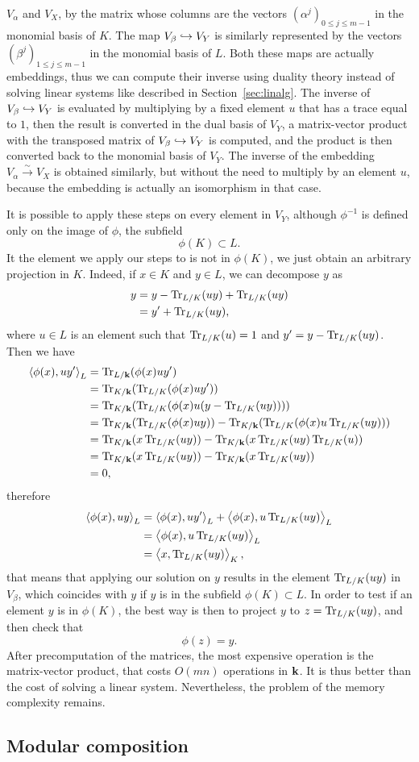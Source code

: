 $V_\alpha$ and $V_X$, by the matrix whose columns are the vectors
$(\alpha^j)_{0\leq j \leq m-1}$ in the monomial basis of $K$. The map
$V_\beta\hookrightarrow V_Y$ is similarly represented by the vectors
$(\beta^{j})_{1\leq j\leq m-1}$ in the monomial basis of $L$. Both these
maps are actually embeddings, thus we can compute their inverse using duality
theory instead of solving linear systems like described in
Section~\ref{sec:linalg}. The inverse of $V_\beta\hookrightarrow V_Y$ is evaluated by
multiplying by a fixed element $u$ that has a trace equal to $1$, then the
result is converted in the dual basis of $V_Y$, a matrix-vector product with the
transposed matrix of $V_\beta\hookrightarrow V_Y$ is computed, and the product is then
converted back to the monomial basis of $V_Y$. The inverse of the embedding
$V_\alpha\overset{\sim}{\to}V_X$ is obtained similarly, but without the need to
multiply by an element $u$, because the embedding is actually an isomorphism in
that case.

It is possible to apply these steps on every element in $V_Y$, although
$\phi^{-1}$ is defined only on the image of $\phi$, \ie the subfield
\[
  \phi(K)\subset L.
\]
It the element we apply our steps to is not in $\phi(K)$, we just obtain an
arbitrary projection in $K$. Indeed, if $x\in K$ and $y\in L$, we can decompose
$y$ as
\begin{align*}
  y &= y - \operatorname{Tr}_{L/K}(uy) + \operatorname{Tr}_{L/K}(uy)\\
  &= y' + \operatorname{Tr}_{L/K}(uy),
\end{align*}
where $u\in L$ is an element such that $\operatorname{Tr}_{L/K}(u)=1$ and
$y'=y-\operatorname{Tr}_{L/K}(uy)$. Then we have
\begin{align*}
  \left\langle\phi(x),uy'\right\rangle_L &= \operatorname{Tr}_{L/\mathbf{k}}(\phi(x)uy')\\
  &= \operatorname{Tr}_{K/\mathbf{k}}(\operatorname{Tr}_{L/K}(\phi(x)uy'))\\
  &= \operatorname{Tr}_{K/\mathbf{k}}(\operatorname{Tr}_{L/K}(\phi(x)u(y-\operatorname{Tr}_{L/K}(uy))))\\
  &=
  \operatorname{Tr}_{K/\mathbf{k}}(\operatorname{Tr}_{L/K}(\phi(x)uy))-\operatorname{Tr}_{K/\mathbf{k}}(\operatorname{Tr}_{L/K}(\phi(x)u\operatorname{Tr}_{L/K}(uy)))\\
  &= \operatorname{Tr}_{K/\mathbf{k}}(x\operatorname{Tr}_{L/K}(uy))-\operatorname{Tr}_{K/\mathbf{k}}(x\operatorname{Tr}_{L/K}(uy)\operatorname{Tr}_{L/K}(u))\\
  &= \operatorname{Tr}_{K/\mathbf{k}}(x\operatorname{Tr}_{L/K}(uy))-\operatorname{Tr}_{K/\mathbf{k}}(x\operatorname{Tr}_{L/K}(uy))\\
  &= 0,
\end{align*}
therefore
\begin{align*}
  \left\langle\phi(x),uy\right\rangle_L &= \left\langle\phi(x),uy'\right\rangle_L+\left\langle\phi(x),u\operatorname{Tr}_{L/K}(uy)\right\rangle_L\\
  &= \left\langle\phi(x),u\operatorname{Tr}_{L/K}(uy)\right\rangle_L\\
  &= \left\langle x,\operatorname{Tr}_{L/K}(uy)\right\rangle_K,
\end{align*}
that means that applying our solution on $y$ results in the element
$\operatorname{Tr}_{L/K}(uy)$ in $V_\beta$, which coincides with $y$ if $y$ is in the subfield
$\phi(K)\subset L$. In order to test if an element $y$ is in $\phi(K)$, the best
way is then to project $y$ to $z = \operatorname{Tr}_{L/K}(uy)$, and then check that
\[
  \phi(z) = y.
\]
After precomputation of the matrices, the most expensive operation is the
matrix-vector product, that costs $O(mn)$ operations in $\mathbf{k}$. It is thus better
than the cost of solving a linear system. Nevertheless, the problem of the memory
complexity remains.
\subsection{Modular composition}
%
